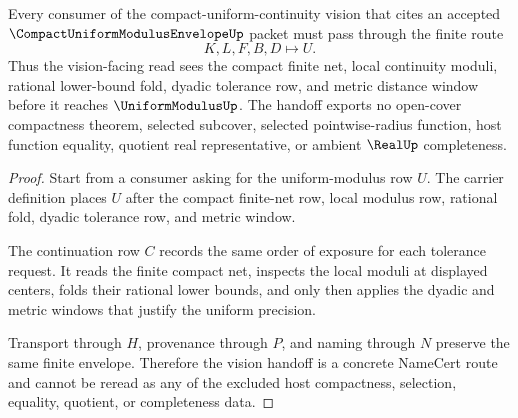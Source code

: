 \begin{theorem}
\label{thm:compact-uniform-modulus-envelope-vision-handoff}
Every consumer of the compact-uniform-continuity vision that cites an accepted $\CompactUniformModulusEnvelopeUp$ packet must pass through the finite route
$$
K,L,F,B,D \longmapsto U .
$$
Thus the vision-facing read sees the compact finite net, local continuity moduli, rational lower-bound fold, dyadic tolerance row, and metric distance window before it reaches $\UniformModulusUp$. The handoff exports no open-cover compactness theorem, selected subcover, selected pointwise-radius function, host function equality, quotient real representative, or ambient $\RealUp$ completeness.
\end{theorem}
\begin{proof}
Start from a consumer asking for the uniform-modulus row $U$. The carrier definition places $U$ after the compact finite-net row, local modulus row, rational fold, dyadic tolerance row, and metric window.

The continuation row $C$ records the same order of exposure for each tolerance request. It reads the finite compact net, inspects the local moduli at displayed centers, folds their rational lower bounds, and only then applies the dyadic and metric windows that justify the uniform precision.

Transport through $H$, provenance through $P$, and naming through $N$ preserve the same finite envelope. Therefore the vision handoff is a concrete NameCert route and cannot be reread as any of the excluded host compactness, selection, equality, quotient, or completeness data.
\end{proof}



